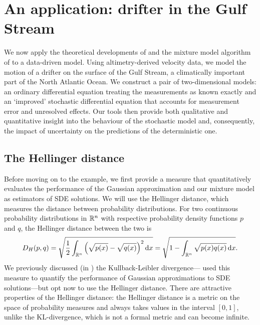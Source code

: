 \chapter{An application: drifter in the Gulf Stream}\label{ch:appls}
We now apply the theoretical developments of  and the mixture model algorithm of  to a data-driven model.
Using altimetry-derived velocity data, we model the motion of a drifter on the surface of the Gulf Stream, a climatically important part of the North Atlantic Ocean.
We construct a pair of two-dimensional models: an ordinary differential equation treating the measurements as known exactly and an `improved' stochastic differential equation that accounts for measurement error and unresolved effects.
Our tools then provide both qualitative and quantitative insight into the behaviour of the stochastic model and, consequently, the impact of uncertainty on the predictions of the deterministic one.


\section{The Hellinger distance}
Before moving on to the example, we first provide a measure that quantitatively evaluates the performance of the Gaussian approximation and our mixture model as estimators of SDE solutions.
We will use the Hellinger distance, which measures the distance between probability distributions.
For two continuous probability distributions in \(\mathbb{R}^n\) with respective probability density functions \(p\) and \(q\), the Hellinger distance between the two is \citep{LeCamLoYang_2000_AsymptoticsStatistics}
\begin{equation}\label{eqn:hell_dist}
	D_H\!\left(p, q\right) = \sqrt{\frac12 \int_{\R^n}{\left(\sqrt{p(x)} - \sqrt{q(x)}\right)^2\dif x}} = \sqrt{1 - \int_{\R^n}{\sqrt{p(x)q(x)}\dif x}}.
\end{equation}
We previously discussed (in ) the Kullback-Leibler divergence---\citet{Sanz-AlonsoStuart_2017_GaussianApproximationsSmall} used this measure to quantify the performance of Gaussian approximations to SDE solutions---but opt now to use the Hellinger distance.
There are attractive properties of the Hellinger distance: the Hellinger distance is a metric on the space of probability measures and always takes values in the interval \([0,1]\), unlike the KL-divergence, which is not a formal metric and can become infinite.

